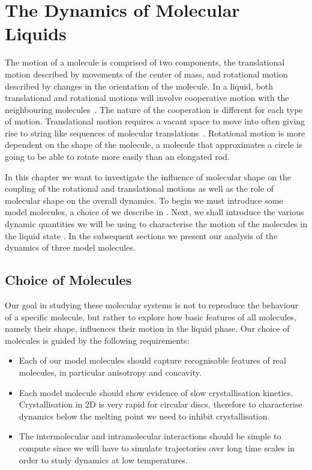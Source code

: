 \chapter{The Dynamics of Molecular Liquids}
\label{sec:dynamics}

The motion of a molecule is comprised of two components, the translational motion described by movements of the center of mass, and rotational motion described by changes in the orientation of the molecule. In a liquid, both translational and rotational motions will involve cooperative motion with the neighbouring molecules~\cite{sillescu:99,goyon:08}. The nature of the cooperation is different for each type of motion. Translational motion requires a vacant space to move into often giving rise to string like sequences of molecular translations~\cite{ediger:12}. Rotational motion is more dependent on the shape of the molecule, a molecule that approximates a circle is going to be able to rotate more easily than an elongated rod. 

In this chapter we want to investigate the influence of molecular shape on the coupling of the rotational and translational motions as well as the role of molecular shape on the overall dynamics. To begin we must introduce some model molecules, a choice of we describe in . Next, we shall introduce the various dynamic quantities we will be using to characterise the motion of the molecules in the liquid state . In the subsequent sections we present our analysis of the dynamics of three model molecules.


\section{Choice of Molecules}
\label{sec:mol choice}

Our goal in studying these molecular systems is not to reproduce the behaviour of a specific molecule, but rather to explore how basic features of all molecules, namely their shape, influences their motion in the liquid phase. Our choice of molecules is guided by the following requirements:
\begin{itemize}
    \item Each of our model molecules should capture recognisable features of real molecules, in particular anisotropy and concavity.
    \item Each model molecule should show evidence of slow crystallisation kinetics. Crystallisation in 2D is very rapid for circular discs, therefore to characterise dynamics below the melting point we need to inhibit crystallisation.
    \item The intermolecular and intramolecular interactions should be simple to compute since we will have to simulate trajectories over long time scales in order to study dynamics at low temperatures.
\end{itemize}

